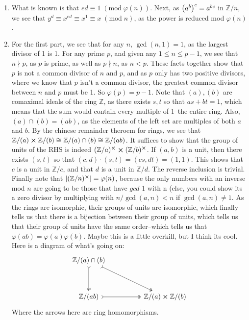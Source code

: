 \documentclass[12pt]{article}
\def\mbb#1{\mathbb{#1}}
\def\bZ{\mbb{Z}}
\theoremstyle{definition}
\theoremstyle{remark}
\renewcommand{\mod}[1]{\;(\mathrm{mod}\; #1)}
\begin{document}
\begin{enumerate}[leftmargin=\labelsep]
\begin{enumerate}
			\item What is known is that $ed \equiv 1 \mod{\varphi(n)}$. Next, as $\qty(a^b)^c = a^{bc}$ in $\bZ/n$, we see that $y^d \equiv x^{ed} \equiv x^1 \equiv x \mod{n}$, as the power is reduced mod $\varphi(n)$.
			
			\item For the first part, we see that for any $n$, $\gcd(n, 1) = 1$, as the largest divisor of 1 is 1. For any prime $p$, and given any $1 \leq n \leq p-1$, we see that $n \nmid p$, as $p$ is prime, as well as $p \nmid n$, as $n < p$. These facts together show that $p$ is not a common divisor of $n$ and $p$, and as $p$ only has two positive divisors, where we know that $p$ isn't a common divisor, the greatest common divisor between $n$ and $p$ must be 1. So $\varphi(p) = p-1$. Note that $(a), (b)$ are comaximal ideals of the ring $\bZ$, as there exists $s, t$ so that $as + bt = 1$, which means that the sum would contain every multiple of 1--the entire ring. Also, $(a) \cap (b) = (ab)$, as the elements of the left set are multiples of both $a$ and $b$. By the chinese remainder theroem for rings, we see that $\bZ/(a) \cross \bZ/(b) \cong \bZ/(a) \cap (b) \cong \bZ/(ab)$. It suffices to show that the group of units of the RHS is indeed $(\bZ/a)^{\cross} \cross (\bZ/b)^{\cross}$. If $(a, b)$ is a unit, then there exists $(s, t)$ so that $(c, d) \cdot (s, t) = (cs, dt) = (1, 1)$. This shows that $c$ is a unit in $\bZ/c$, and that $d$ is a unit in $\bZ/d$. The reverse inclusion is trivial. Finally note that $|(\bZ/n)^{\cross}|=\varphi(n)$, because the only numbers with an inverse mod $n$ are going to be those that have $gcd$ 1 with n (else, you could show its a zero divisor by multiplying with $n/\gcd(a, n) < n$ if $\gcd(a, n) \neq 1$. As the rings are isomorphic, their groups of units are isomorphic, which finally tells us that there is a bijection between their group of units, which tells us that their group of units have the same order--which tells us that $\varphi(ab) = \varphi(a)\varphi(b)$. Maybe this is a little overkill, but I think its cool.
			Here is a diagram of what's going on:
			\[\begin{tikzcd}
				{\bZ/(a)\cap(b)} \\
				\\
				{\bZ/(ab)} && {\bZ/(a) \cross \bZ/(b)}
				\arrow[tail, two heads, from=1-1, to=3-3]
				\arrow[tail, two heads, from=1-1, to=3-1]
				\arrow[tail, two heads, from=3-1, to=3-3]
			\end{tikzcd}\]
		Where the arrows here are ring homomorphisms.
		\end{enumerate}
		

\end{enumerate}
\end{document}
